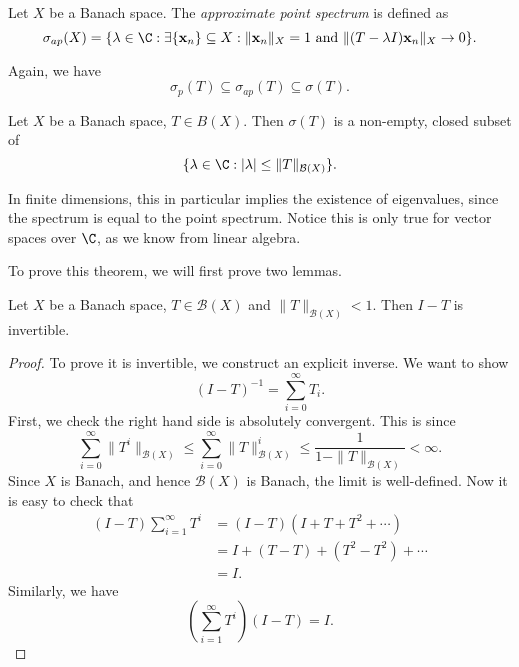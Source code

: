 \documentclass[a4paper]{article}
\begin{document}
\begin{defi}
  Let $X$ be a Banach space. The \emph{approximate point spectrum} is defined as
  \[
    \sigma_{ap}(X) = \{ \lambda \in \C: \exists \{\mathbf{x}_n\} \subseteq X: \|\mathbf{x}_n\|_X = 1\text{ and }\|(T - \lambda I)\mathbf{x}_n\|_X \to 0\}.
  \]
\end{defi}
Again, we have
\[
  \sigma_p(T) \subseteq \sigma_{ap}(T) \subseteq \sigma(T).
\]

\begin{thm}
  Let $X$ be a Banach space, $T \in B(X)$. Then $\sigma(T)$ is a non-empty, closed subset of
  \[
    \{\lambda \in \C: |\lambda| \leq \|T\|_{\mathcal{B}(X)}\}.
  \]
\end{thm}
In finite dimensions, this in particular implies the existence of eigenvalues, since the spectrum is equal to the point spectrum. Notice this is only true for vector spaces over $\C$, as we know from linear algebra.

To prove this theorem, we will first prove two lemmas.
\begin{lemma}
  Let $X$ be a Banach space, $T \in \mathcal{B}(X)$ and $\|T\|_{\mathcal{B}(X)} < 1$. Then $I - T$ is invertible.
\end{lemma}

\begin{proof}
  To prove it is invertible, we construct an explicit inverse. We want to show
  \[
    (I - T)^{-1} = \sum_{i = 0}^\infty T_i.
  \]
  First, we check the right hand side is absolutely convergent. This is since
  \[
    \sum_{i = 0}^\infty \|T^i\|_{\mathcal{B}(X)} \leq \sum_{i = 0}^\infty \|T\|_{\mathcal{B}(X)}^i \leq \frac{1}{1 - \|T\|_{\mathcal{B}(X)}} < \infty.
  \]
  Since $X$ is Banach, and hence $\mathcal{B}(X)$ is Banach, the limit is well-defined. Now it is easy to check that
  \begin{align*}
    (I - T) \sum_{i = 1}^\infty T^i &= (I - T)(I + T + T^2 + \cdots) \\
    &= I + (T - T) + (T^2 - T^2) + \cdots \\
    &= I.
  \end{align*}
  Similarly, we have
  \[
    \left(\sum_{i = 1}^\infty T^i\right)(I - T) = I.
  \]
\end{proof}
\end{document}
